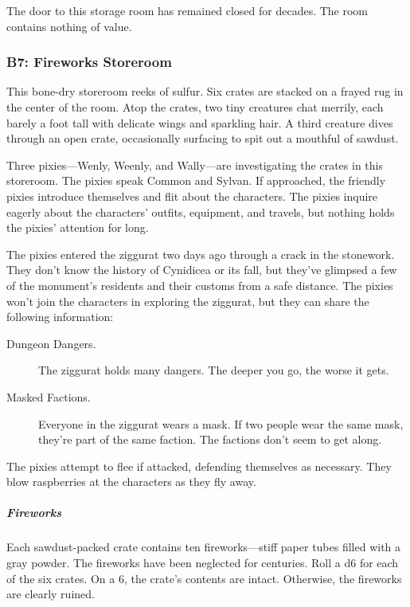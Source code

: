 \documentclass[10pt,a4paper,twoside,bg=print,twocolumn,openany,nodeprecatedcode]{dndbook}
\begin{document}
The door to this storage room has remained closed for decades. The room contains nothing of value.

\subsubsection{B7: Fireworks Storeroom}
\begin{DndReadAloud}{}
This bone-dry storeroom reeks of sulfur. Six crates are stacked on a frayed rug in the center of the room. Atop the crates, two tiny creatures chat merrily, each barely a foot tall with delicate wings and sparkling hair. A third creature dives through an open crate, occasionally surfacing to spit out a mouthful of sawdust.

\end{DndReadAloud}

Three pixies—Wenly, Weenly, and Wally—are investigating the crates in this storeroom. The pixies speak Common and Sylvan. If approached, the friendly pixies introduce themselves and flit about the characters. The pixies inquire eagerly about the characters' outfits, equipment, and travels, but nothing holds the pixies' attention for long.

The pixies entered the ziggurat two days ago through a crack in the stonework. They don't know the history of Cynidicea or its fall, but they've glimpsed a few of the monument's residents and their customs from a safe distance. The pixies won't join the characters in exploring the ziggurat, but they can share the following information:


\begin{description}
\item[Dungeon Dangers.]
The ziggurat holds many dangers. The deeper you go, the worse it gets.
\item[Masked Factions.]
Everyone in the ziggurat wears a mask. If two people wear the same mask, they're part of the same faction. The factions don't seem to get along.
\end{description}

The pixies attempt to flee if attacked, defending themselves as necessary. They blow raspberries at the characters as they fly away.

\subparagraph{Fireworks}
Each sawdust-packed crate contains ten fireworks—stiff paper tubes filled with a gray powder. The fireworks have been neglected for centuries. Roll a d6 for each of the six crates. On a 6, the crate's contents are intact. Otherwise, the fireworks are clearly ruined.
\end{document}
